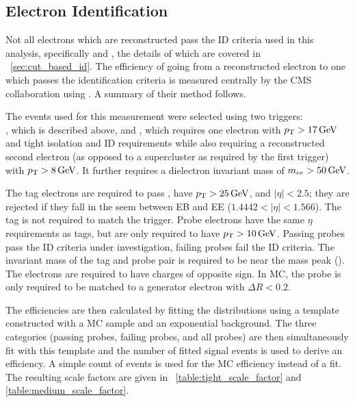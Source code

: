 

\subsection{Electron Identification}
\label{ssec:sf_id}

Not all electrons which are reconstructed pass the ID criteria used in this
analysis, specifically \EGMEDIUM and \EGTIGHT, the details of which are covered
in \SEC~\ref{sec:cut_based_id}. The efficiency of going from a
reconstructed electron to one which passes the identification criteria is
measured centrally by the CMS collaboration using \TnP \cite{cms_an_2014-055}.
A summary of their method follows.

The events used for this measurement were selected using two triggers: \\
\TnPTrigger, which is described above, and \TnPTriggerSecond, which requires
one electron with $p_{\mathrm{T}} > 17 \,\text{Ge\hspace{-.08em}V}$ and tight isolation and ID requirements while
also requiring a reconstructed second electron (as opposed to a supercluster as
required by the first trigger) with $p_{\mathrm{T}} > 8 \,\text{Ge\hspace{-.08em}V}$. It further requires a
dielectron invariant mass of $m_{ee} > 50 \,\text{Ge\hspace{-.08em}V}$.

The tag electrons are required to pass \EGTIGHT, have $p_{\mathrm{T}} > 25 \,\text{Ge\hspace{-.08em}V}$, and
$|\eta| < 2.5$; they are rejected if they fall in the seem between EB and EE
($1.4442 < |\eta| < 1.566$). The tag is not required to match the trigger.
Probe electrons have the same $\eta$ requirements as tags, but are only
required to have $p_{\mathrm{T}} > 10 \,\text{Ge\hspace{-.08em}V}$. Passing probes pass the ID criteria under
investigation, failing probes fail the ID criteria. The invariant mass of the
tag and probe pair is required to be near the \Z mass peak (\MassRange). The
electrons are required to have charges of opposite sign. In MC, the probe is
only required to be matched to a generator electron with $\Delta R < 0.2$.

The efficiencies are then calculated by fitting the \mee distributions using a
template constructed with a \Ztoee MC sample and an exponential background. The
three categories (passing probes, failing probes, and all probes) are then
simultaneously fit with this template and the number of fitted signal events is
used to derive an efficiency. A simple count of events is used for the MC
efficiency instead of a fit. The resulting scale factors are given in
\TABS~\ref{table:tight_scale_factor} and \ref{table:medium_scale_factor}.




